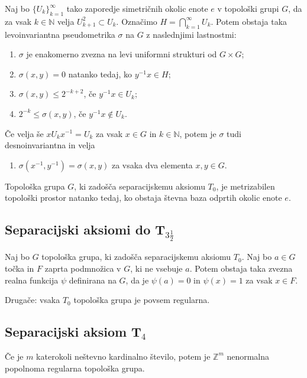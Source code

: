 \documentclass[mat1]{fmfdelo}
\newcommand{\N}{\mathbb N}
\newcommand{\Z}{\mathbb Z}
\begin{document}
\begin{izrek}\label{izr:pseudometrika}
	Naj bo $\lbrace U_k \rbrace_{k = 1}^{\infty}$ tako zaporedje simetričnih okolic enote $e$ v topološki grupi $G$, da za vsak $k \in \N$ velja $U_{k+1}^2 \subset U_k$. Označimo $H = \bigcap_{k=1}^{\infty} U_k$. Potem obstaja taka levoinvariantna pseudometrika $\sigma$ na $G$ z naslednjimi lastnostmi:
	\begin{enumerate}
		\item $\sigma$ je enakomerno zvezna na levi uniformni strukturi od $G \times G$;
		\item $\sigma (x, y) = 0$ natanko tedaj, ko $y^{-1}x \in H$;
		\item $\sigma (x, y) \leq 2^{-k+2}$, če $y^{-1}x \in U_k$;
		\item $2^{-k} \leq \sigma (x, y)$, če $y^{-1}x \notin U_k$.
	\end{enumerate}
	
	Če velja še $x U_k x^{-1} = U_k$ za vsak $x \in G$ in $k \in \N$, potem je $\sigma$ tudi desnoinvariantna in velja
	\begin{enumerate}[resume]
		\item $\sigma (x^{-1}, y^{-1}) = \sigma (x, y)$ za vsaka dva elementa $x, y \in G$.
	\end{enumerate}
\end{izrek}

\begin{izrek}\label{izr:metrizabilnost}
	Topološka grupa $G$, ki zadošča separacijskemu aksiomu $T_0$, je metrizabilen topološki prostor natanko tedaj, ko obstaja števna baza odprtih okolic enote $e$.
\end{izrek}

\subsection{Separacijski aksiomi do T$_{3 \frac{1}{2}}$}

\begin{izrek}\label{izr:t3pol}
	Naj bo $G$ topološka grupa, ki zadošča separacijskemu aksiomu $T_0$. Naj bo $a \in G$ točka in $F$ zaprta podmnožica v $G$, ki ne vsebuje $a$. Potem obstaja taka zvezna realna funkcija $\psi$ definirana na $G$, da je $\psi (a) = 0$ in $\psi (x) = 1$ za vsak $x \in F$.
	
	Drugače: vsaka $T_0$ topološka grupa je povsem regularna.
\end{izrek}

\subsection{Separacijski aksiom T$_4$}
\begin{izrek}\label{izr:t4protiprimer}
	Če je $m$ katerokoli neštevno kardinalno število, potem je $\Z^{m}$ nenormalna popolnoma regularna topološka grupa.
\end{izrek}
\end{document}
